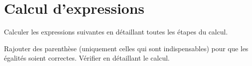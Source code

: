 \section{Calcul d'expressions}

\begin{questions}
	\question Calculer les expressions suivantes en détaillant toutes les étapes du calcul.
	\begin{multicols}{2}
	\end{multicols}	
	

	\question Rajouter des parenthèse (uniquement celles qui sont indispensables) pour que les égalités soient correctes. Vérifier en détaillant le calcul.
	
	\begin{parts}
		
	\end{parts}
\end{questions}